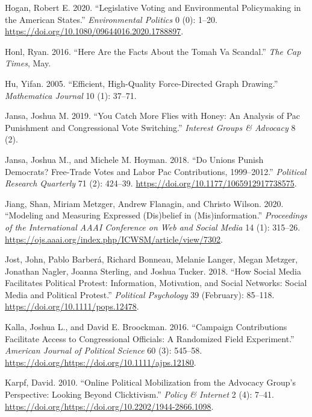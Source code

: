 \documentclass[12pt,]{article}
\begin{document}
\leavevmode\hypertarget{ref-hogan2020}{}%
Hogan, Robert E. 2020. ``Legislative Voting and Environmental
Policymaking in the American States.'' \emph{Environmental Politics} 0
(0): 1--20. \url{https://doi.org/10.1080/09644016.2020.1788897}.

\leavevmode\hypertarget{ref-honl2016}{}%
Honl, Ryan. 2016. ``Here Are the Facts About the Tomah Va Scandal.''
\emph{The Cap Times}, May.

\leavevmode\hypertarget{ref-yifanhu}{}%
Hu, Yifan. 2005. ``Efficient, High-Quality Force-Directed Graph
Drawing.'' \emph{Mathematica Journal} 10 (1): 37--71.

\leavevmode\hypertarget{ref-jansa2019}{}%
Jansa, Joshua M. 2019. ``You Catch More Flies with Honey: An Analysis of
Pac Punishment and Congressional Vote Switching.'' \emph{Interest Groups
\& Advocacy} 8 (2).

\leavevmode\hypertarget{ref-jansa2018}{}%
Jansa, Joshua M., and Michele M. Hoyman. 2018. ``Do Unions Punish
Democrats? Free-Trade Votes and Labor Pac Contributions, 1999--2012.''
\emph{Political Research Quarterly} 71 (2): 424--39.
\url{https://doi.org/10.1177/1065912917738575}.

\leavevmode\hypertarget{ref-jiang2020}{}%
Jiang, Shan, Miriam Metzger, Andrew Flanagin, and Christo Wilson. 2020.
``Modeling and Measuring Expressed (Dis)belief in (Mis)information.''
\emph{Proceedings of the International AAAI Conference on Web and Social
Media} 14 (1): 315--26.
\url{https://ojs.aaai.org/index.php/ICWSM/article/view/7302}.

\leavevmode\hypertarget{ref-jost2018}{}%
Jost, John, Pablo Barberá, Richard Bonneau, Melanie Langer, Megan
Metzger, Jonathan Nagler, Joanna Sterling, and Joshua Tucker. 2018.
``How Social Media Facilitates Political Protest: Information,
Motivation, and Social Networks: Social Media and Political Protest.''
\emph{Political Psychology} 39 (February): 85--118.
\url{https://doi.org/10.1111/pops.12478}.

\leavevmode\hypertarget{ref-kalla2016}{}%
Kalla, Joshua L., and David E. Broockman. 2016. ``Campaign Contributions
Facilitate Access to Congressional Officials: A Randomized Field
Experiment.'' \emph{American Journal of Political Science} 60 (3):
545--58. \url{https://doi.org/https://doi.org/10.1111/ajps.12180}.

\leavevmode\hypertarget{ref-karpf2010}{}%
Karpf, David. 2010. ``Online Political Mobilization from the Advocacy
Group's Perspective: Looking Beyond Clicktivism.'' \emph{Policy \&
Internet} 2 (4): 7--41.
\url{https://doi.org/https://doi.org/10.2202/1944-2866.1098}.
\end{document}
